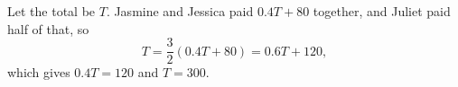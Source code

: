 Let the total be $T$. Jasmine and Jessica paid $0.4T+80$ together, and Juliet paid half of that, so
\[T=\dfrac32(0.4T+80)=0.6T+120,\]
which gives $0.4T=120$ and $T=\boxed{300}$.
